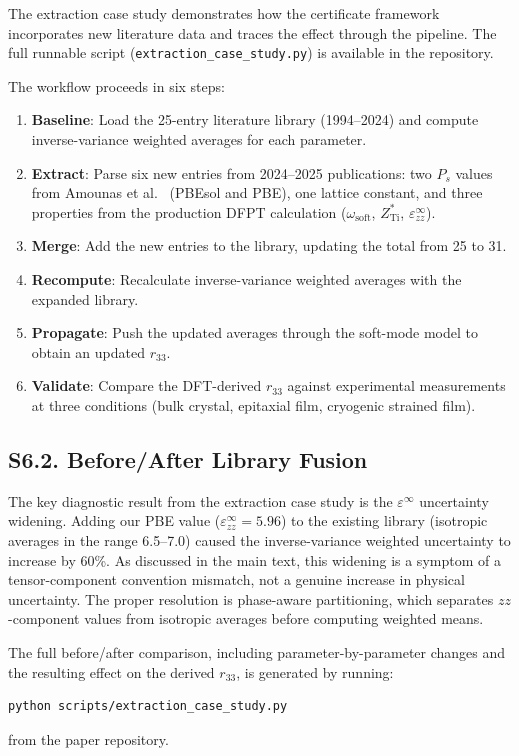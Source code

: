 ﻿\documentclass[prb,onecolumn,superscriptaddress,amsmath,amssymb,longbibliography]{revtex4-2}
\begin{document}
The extraction case study demonstrates how the certificate framework
incorporates new literature data and traces the effect through the pipeline.
The full runnable script (\texttt{extraction\_case\_study.py}) is available
in the repository.

The workflow proceeds in six steps:
\begin{enumerate}
    \item \textbf{Baseline}: Load the 25-entry literature library
    (1994--2024) and compute inverse-variance weighted averages for each
    parameter.

    \item \textbf{Extract}: Parse six new entries from 2024--2025
    publications: two $P_s$ values from Amounas et al.\ \cite{Amounas2024}
    (PBEsol and PBE), one lattice constant, and three properties from the
    production DFPT calculation ($\omega_{\mathrm{soft}}$,
    $Z^*_{\mathrm{Ti}}$, $\varepsilon^\infty_{zz}$).

    \item \textbf{Merge}: Add the new entries to the library, updating the
    total from 25 to 31.

    \item \textbf{Recompute}: Recalculate inverse-variance weighted averages
    with the expanded library.

    \item \textbf{Propagate}: Push the updated averages through the soft-mode
    model to obtain an updated $r_{33}$.

    \item \textbf{Validate}: Compare the DFT-derived $r_{33}$ against
    experimental measurements at three conditions (bulk crystal, epitaxial
    film, cryogenic strained film).
\end{enumerate}


\subsection{S6.2. Before/After Library Fusion}

The key diagnostic result from the extraction case study is the
$\varepsilon^\infty$ uncertainty widening. Adding our PBE value
($\varepsilon^\infty_{zz} = 5.96$) to the existing library (isotropic
averages in the range 6.5--7.0) caused the inverse-variance weighted
uncertainty to increase by 60\%. As discussed in the main text, this
widening is a symptom of a tensor-component convention mismatch, not a
genuine increase in physical uncertainty. The proper resolution is
phase-aware partitioning, which separates $zz$-component values from
isotropic averages before computing weighted means.

The full before/after comparison, including parameter-by-parameter
changes and the resulting effect on the derived $r_{33}$, is generated
by running:

\begin{verbatim}
python scripts/extraction_case_study.py
\end{verbatim}

from the paper repository.



\end{document}
